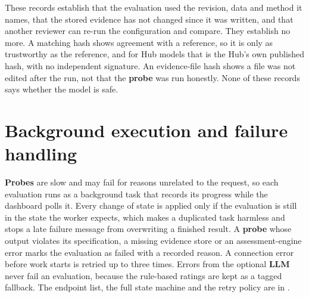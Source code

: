 These records establish that the evaluation used the revision, data and method it names, that the stored evidence has not changed since it was written, and that another reviewer can re-run the configuration and compare. They establish no more. A matching hash shows agreement with a reference, so it is only as trustworthy as the reference, and for Hub models that is the Hub's own published hash, with no independent signature. An evidence-file hash shows a file was not edited after the run, not that the \textbf{probe} was run honestly. None of these records says whether the model is safe.

\section{Background execution and failure handling}\label{sec:api}
\textbf{Probes} are slow and may fail for reasons unrelated to the request, so each evaluation runs as a background task that records its progress while the dashboard polls it. Every change of state is applied only if the evaluation is still in the state the worker expects, which makes a duplicated task harmless and stops a late failure message from overwriting a finished result. A \textbf{probe} whose output violates its specification, a missing evidence store or an assessment-engine error marks the evaluation as failed with a recorded reason. A connection error before work starts is retried up to three times. Errors from the optional \textbf{LLM} never fail an evaluation, because the rule-based ratings are kept as a tagged fallback. The endpoint list, the full state machine and the retry policy are in .
